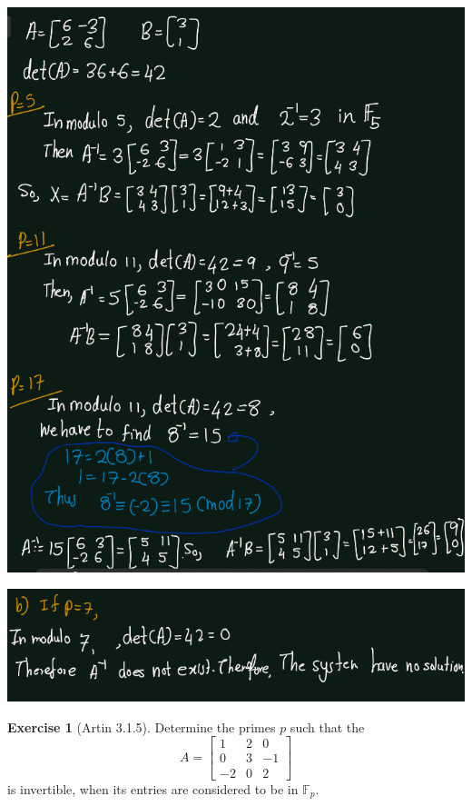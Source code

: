 \documentclass[
]{book}
\theoremstyle{definition}
\theoremstyle{definition}
\theoremstyle{definition}
\newtheorem{exercise}{Exercise}[chapter]
\theoremstyle{definition}
\theoremstyle{remark}
\begin{document}
\includegraphics{figures/ch_3/ex-1.4-1.png}

\includegraphics{figures/ch_3/ex-1.4-2.png}

\begin{exercise}[Artin 3.1.5]
\protect\hypertarget{exr:unnamed-chunk-261}{}\label{exr:unnamed-chunk-261}Determine the primes \(p\) such that the
\[A =\begin{bmatrix} 1 & 2 & 0 \\ 0 & 3 & -1 \\ -2 & 0 & 2 \end{bmatrix}\]
is invertible, when its entries are considered to be in \(\mathbb{F}_p\).
\end{exercise}
\end{document}
